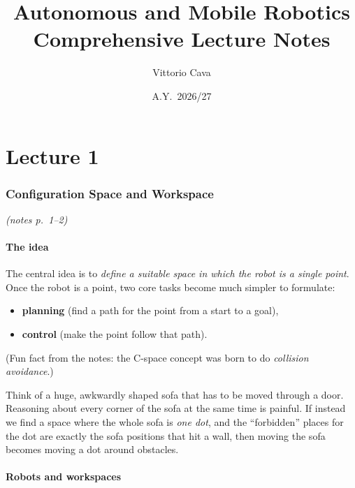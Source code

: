 \documentclass[11pt,a4paper]{article}
\title{\textbf{Autonomous and Mobile Robotics}\\[6pt]\large Comprehensive Lecture Notes}
\author{Vittorio Cava}
\date{A.Y.~2026/27}
\newcommand{\pts}[1]{\emph{(notes p.~#1)}}
\theoremstyle{definition}
\theoremstyle{plain}
\theoremstyle{remark}
\begin{document}
\maketitle
\tableofcontents
\newpage

\setcounter{section}{0}
\renewcommand{\thesection}{\arabic{section}}
\part{Lecture 1}

\section{Configuration Space and Workspace}\pts{1--2}

\subsection{The idea}

The central idea is to \emph{define a suitable space in which the robot is a single point}. Once the robot is a point, two core tasks become much simpler to formulate:
\begin{itemize}[nosep]
  \item \textbf{planning} (find a path for the point from a start to a goal),
  \item \textbf{control} (make the point follow that path).
\end{itemize}
(Fun fact from the notes: the C-space concept was born to do \emph{collision avoidance}.)

\begin{intuition}
Think of a huge, awkwardly shaped sofa that has to be moved through a door. Reasoning about every corner of the sofa at the same time is painful. If instead we find a space where the whole sofa is \emph{one dot}, and the ``forbidden'' places for the dot are exactly the sofa positions that hit a wall, then moving the sofa becomes moving a dot around obstacles.
\end{intuition}

\subsection{Robots and workspaces}
\end{document}
